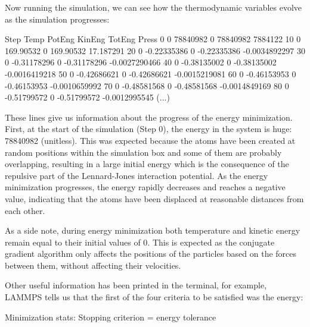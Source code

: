\noindent Now running the simulation, we can see how the thermodynamic
variables evolve as the simulation progresses:

\begin{lcverbatim}
Step  Temp  PotEng         KinEng    TotEng         Press     
0     0     78840982       0         78840982       7884122      
10    0     169.90532      0         169.90532      17.187291    
20    0    -0.22335386     0        -0.22335386    -0.0034892297 
30    0    -0.31178296     0        -0.31178296    -0.0027290466 
40    0    -0.38135002     0        -0.38135002    -0.0016419218 
50    0    -0.42686621     0        -0.42686621    -0.0015219081 
60    0    -0.46153953     0        -0.46153953    -0.0010659992 
70    0    -0.48581568     0        -0.48581568    -0.0014849169 
80    0    -0.51799572     0        -0.51799572    -0.0012995545 
(...)
\end{lcverbatim}

\noindent These lines give us information about
the progress of the energy minimization. First, at the start
of the simulation (Step 0), the energy in the system is
huge: 78840982 (unitless). This was expected because
the atoms have been created at random positions within the
simulation box and some of them are probably overlapping,
resulting in a large initial energy which is the consequence
of the repulsive part of the Lennard-Jones interaction
potential. As the energy minimization progresses, the energy
rapidly decreases and reaches a negative value, indicating that the atoms have been
displaced at reasonable distances from each other.

\begin{tcolorbox}[colback=mylightblue!5!white,colframe=mylightblue!75!black,title=On the temperature during energy minimization]

\vspace{0.25cm} \noindent As a side note, during energy minimization both temperature and kinetic energy remain equal to
their initial values of 0. This is expected as the conjugate gradient
algorithm only affects the positions of the particles based on the
forces between them, without affecting their velocities.
\end{tcolorbox}

\noindent Other useful information has been printed in the terminal, for
example, LAMMPS tells us that the first of the four criteria
to be satisfied was the energy:

\begin{lcverbatim}
Minimization stats:
Stopping criterion = energy tolerance
\end{lcverbatim}

